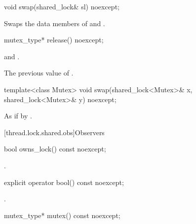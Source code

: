 %
\begin{itemdecl}
void swap(shared_lock& sl) noexcept;
\end{itemdecl}

\begin{itemdescr}
\pnum
\effects
Swaps the data members of  and .
\end{itemdescr}

%
\begin{itemdecl}
mutex_type* release() noexcept;
\end{itemdecl}

\begin{itemdescr}
\pnum
\ensures
{} and .

\pnum
\returns
The previous value of .
\end{itemdescr}

%
\begin{itemdecl}
template<class Mutex>
  void swap(shared_lock<Mutex>& x, shared_lock<Mutex>& y) noexcept;
\end{itemdecl}

\begin{itemdescr}
\pnum
\effects
As if by .
\end{itemdescr}

[thread.lock.shared.obs]{Observers}

%
\begin{itemdecl}
bool owns_lock() const noexcept;
\end{itemdecl}

\begin{itemdescr}
\pnum
\returns
{}.
\end{itemdescr}

%
\begin{itemdecl}
explicit operator bool() const noexcept;
\end{itemdecl}

\begin{itemdescr}
\pnum
\returns
{}.
\end{itemdescr}

%
\begin{itemdecl}
mutex_type* mutex() const noexcept;
\end{itemdecl}

